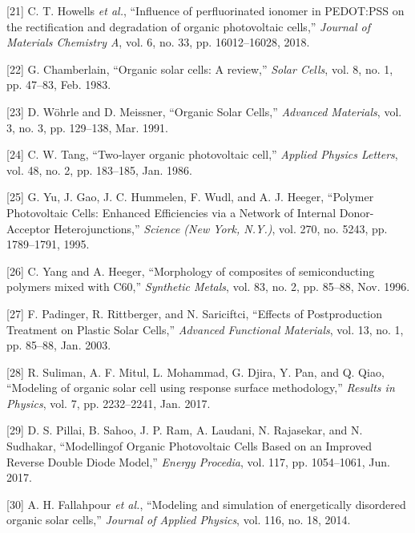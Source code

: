 \documentclass[]{article}
\begin{document}
\leavevmode\hypertarget{ref-Howells2018}{}%
{[}21{]} C. T. Howells \emph{et al.}, ``Influence of perfluorinated ionomer in PEDOT:PSS on the rectification and degradation of organic photovoltaic cells,'' \emph{Journal of Materials Chemistry A}, vol. 6, no. 33, pp. 16012--16028, 2018.

\leavevmode\hypertarget{ref-Chamberlain1983}{}%
{[}22{]} G. Chamberlain, ``Organic solar cells: A review,'' \emph{Solar Cells}, vol. 8, no. 1, pp. 47--83, Feb. 1983.

\leavevmode\hypertarget{ref-Wohrle1991}{}%
{[}23{]} D. Wöhrle and D. Meissner, ``Organic Solar Cells,'' \emph{Advanced Materials}, vol. 3, no. 3, pp. 129--138, Mar. 1991.

\leavevmode\hypertarget{ref-Tang1986}{}%
{[}24{]} C. W. Tang, ``Two‐layer organic photovoltaic cell,'' \emph{Applied Physics Letters}, vol. 48, no. 2, pp. 183--185, Jan. 1986.

\leavevmode\hypertarget{ref-Yu1995}{}%
{[}25{]} G. Yu, J. Gao, J. C. Hummelen, F. Wudl, and A. J. Heeger, ``Polymer Photovoltaic Cells: Enhanced Efficiencies via a Network of Internal Donor-Acceptor Heterojunctions,'' \emph{Science (New York, N.Y.)}, vol. 270, no. 5243, pp. 1789--1791, 1995.

\leavevmode\hypertarget{ref-Yang1996}{}%
{[}26{]} C. Yang and A. Heeger, ``Morphology of composites of semiconducting polymers mixed with C60,'' \emph{Synthetic Metals}, vol. 83, no. 2, pp. 85--88, Nov. 1996.

\leavevmode\hypertarget{ref-Padinger2003}{}%
{[}27{]} F. Padinger, R. Rittberger, and N. Sariciftci, ``Effects of Postproduction Treatment on Plastic Solar Cells,'' \emph{Advanced Functional Materials}, vol. 13, no. 1, pp. 85--88, Jan. 2003.

\leavevmode\hypertarget{ref-Suliman2017}{}%
{[}28{]} R. Suliman, A. F. Mitul, L. Mohammad, G. Djira, Y. Pan, and Q. Qiao, ``Modeling of organic solar cell using response surface methodology,'' \emph{Results in Physics}, vol. 7, pp. 2232--2241, Jan. 2017.

\leavevmode\hypertarget{ref-Pillai2017}{}%
{[}29{]} D. S. Pillai, B. Sahoo, J. P. Ram, A. Laudani, N. Rajasekar, and N. Sudhakar, ``Modellingof Organic Photovoltaic Cells Based on an Improved Reverse Double Diode Model,'' \emph{Energy Procedia}, vol. 117, pp. 1054--1061, Jun. 2017.

\leavevmode\hypertarget{ref-Fallahpour2014}{}%
{[}30{]} A. H. Fallahpour \emph{et al.}, ``Modeling and simulation of energetically disordered organic solar cells,'' \emph{Journal of Applied Physics}, vol. 116, no. 18, 2014.
\end{document}
